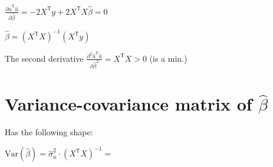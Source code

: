 \documentclass[10pt, a4paper, landscape]{article}
\newcommand{\Var}{\mathrm{Var}}
\newcommand{\tr}{\mathsf{T}}
\begin{document}
\begin{multicols}{3}
\begin{itemize}[leftmargin=*]
			\begin{center}
				$\frac{\partial \hat{u}^{\tr} \hat{u}}{\partial \hat{\beta}} = -2 X^{\tr} y + 2 X^{\tr} X \hat{\beta} = 0$
				
				$\hat{\beta} = (X^{\tr} X)^{-1} (X^{\tr} y)$
				
			\end{center}
			
			The second derivative $\frac{\partial^{2} \hat{u}^{\tr} \hat{u}}{\partial \hat{\beta}^{2}} = X^{\tr} X > 0$ (is a min.)
		\end{itemize}
		
		\section*{Variance-covariance matrix of $\hat{\beta}$}
		
		Has the following shape:
		
		\begin{center}
			$\Var(\hat{\beta}) = \hat{\sigma}^{2}_{u} \cdot (X^{\tr} X)^{-1}=$
		\end{center}
		

\end{multicols}
\end{document}
